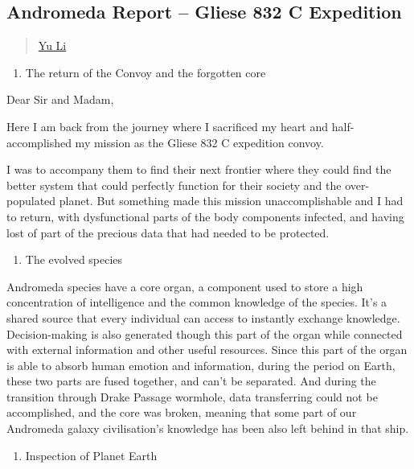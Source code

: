 \subsection{Andromeda Report -- Gliese 832 C
Expedition}\label{andromeda-report}

\begin{quote}
\href{../appendix/attributions.html\#yu-li}{Yu Li}
\end{quote}

\begin{enumerate}
\def\labelenumi{\arabic{enumi}.}
\tightlist
\item
  The return of the Convoy and the forgotten core
\end{enumerate}

Dear Sir and Madam,

Here I am back from the journey where I sacrificed my heart and
half-accomplished my mission as the Gliese 832 C expedition convoy.

I was to accompany them to find their next frontier where they could
find the better system that could perfectly function for their society
and the over-populated planet. But something made this mission
unaccomplishable and I had to return, with dysfunctional parts of the
body components infected, and having lost of part of the precious data
that had needed to be protected.

\begin{enumerate}
\def\labelenumi{\arabic{enumi}.}
\setcounter{enumi}{1}
\tightlist
\item
  The evolved species
\end{enumerate}

Andromeda species have a core organ, a component used to store a high
concentration of intelligence and the common knowledge of the species.
It's a shared source that every individual can access to instantly
exchange knowledge. Decision-making is also generated though this part
of the organ while connected with external information and other useful
resources. Since this part of the organ is able to absorb human emotion
and information, during the period on Earth, these two parts are fused
together, and can't be separated. And during the transition through
Drake Passage wormhole, data transferring could not be accomplished, and
the core was broken, meaning that some part of our Andromeda galaxy
civilisation's knowledge has been also left behind in that ship.

\begin{enumerate}
\def\labelenumi{\arabic{enumi}.}
\setcounter{enumi}{2}
\tightlist
\item
  Inspection of Planet Earth
\end{enumerate}

